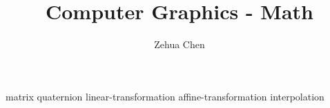 \documentclass[letterpaper, 11pt]{report}
\title{Computer Graphics - Math}
\author{Zehua Chen}
\begin{document}
  \maketitle
  \tableofcontents

  {matrix}
  {quaternion}
  {linear-transformation}
  {affine-transformation}
  {interpolation}
\end{document}
